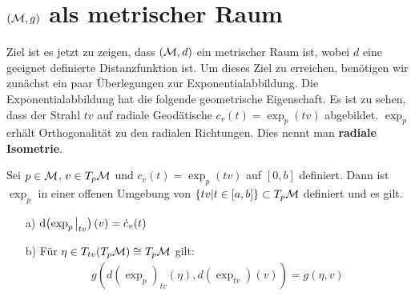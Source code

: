 \section{$(\mathcal{M}, g)$ als metrischer Raum} 
Ziel ist es jetzt zu zeigen, dass $(\mathcal{M}, d)$ ein metrischer Raum ist, wobei $d$ eine geeignet definierte Distanzfunktion ist.
Um dieses Ziel zu erreichen, benötigen wir zunächst ein paar Überlegungen zur Exponentialabbildung.
Die Exponentialabbildung hat die folgende geometrische Eigenschaft.
Es ist zu sehen, dass der Strahl $t v$ auf radiale Geodätische $c_v(t) = \exp_p (t v)$ abgebildet.
$\exp_p$ erhält Orthogonalität zu den radialen Richtungen.
Dies nennt man \textbf{radiale Isometrie}.
\begin{lem}[Gaußlemma]
    \label{lem:gaußlemma}
    Sei $p \in \mathcal{M}$, $v \in T_p \mathcal{M} $ und $c_v(t) = \exp_p(tv)$ auf $[0, b]$ definiert.
    Dann ist $\exp_p$ in einer offenen Umgebung von $\{ tv \vert t\in [a, b] \} \subset T_p \mathcal{M}$ definiert und es gilt.
    \begin{itemize}
     \item[a)] $\dd ( \exp_p \eval_{t v})(v) = \dot{c}_v(t)$
    \item [b)] Für $\eta \in T_{tv} ( T_p \mathcal{M} ) \cong T_p \mathcal{M}$ gilt:
    \begin{align*}
        g(d(\exp_p)_{tv} (\eta), d(\exp_{tv})(v)) = g(\eta, v)
    \end{align*}
    \end{itemize}
\end{lem}
